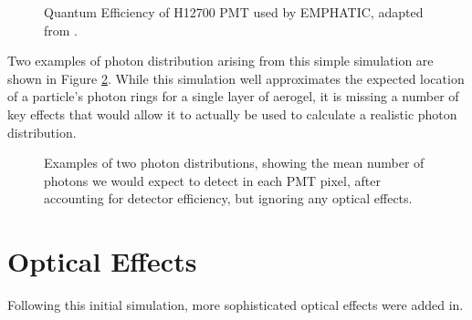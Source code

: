 \begin{figure}[]
\centering
{}
\caption[Quantum Efficiency of H12700 PMT used by EMPHATIC.]{Quantum Efficiency of H12700 PMT used by EMPHATIC, adapted from \cite{H12700}.}
\label{fig:qEff} 
\end{figure}

Two examples of photon distribution arising from this simple simulation are shown in Figure \ref{fig:noScat}. While this simulation well approximates the expected location of a particle's photon rings for a single layer of aerogel, it is missing a number of key effects that would allow it to actually be used to calculate a realistic photon distribution.


\begin{figure}[]
  \centering
  \hfill
  \caption{ Examples of two photon distributions, showing the mean number of photons we would expect to detect in each PMT pixel, after accounting for detector efficiency, but ignoring any optical effects. }
  \label{fig:noScat}
\end{figure}

\section{Optical Effects}
Following this initial simulation, more sophisticated optical effects were added in. 

